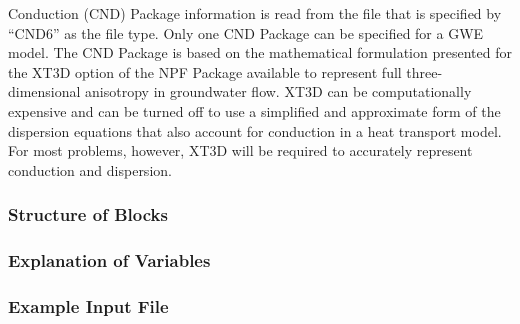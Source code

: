 Conduction (CND) Package information is read from the file that is specified by ``CND6'' as the file type.  Only one CND Package can be specified for a GWE model.  The CND Package is based on the mathematical formulation presented for the XT3D option of the NPF Package available to represent full three-dimensional anisotropy in groundwater flow.  XT3D can be computationally expensive and can be turned off to use a simplified and approximate form of the dispersion equations that also account for conduction in a heat transport model.  For most problems, however, XT3D will be required to accurately represent conduction and dispersion.

\vspace{5mm}
\subsubsection{Structure of Blocks}



\vspace{5mm}
\subsubsection{Explanation of Variables}
\begin{description}

\end{description}

\vspace{5mm}
\subsubsection{Example Input File}



